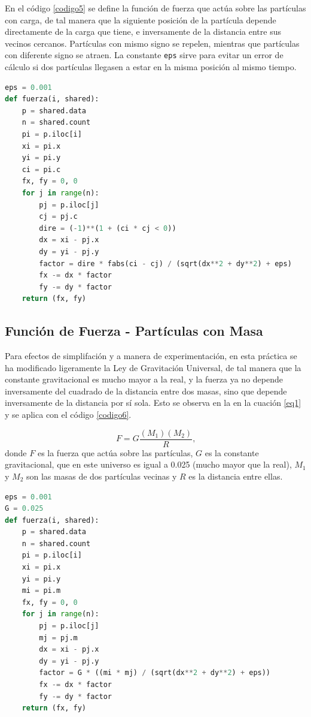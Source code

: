 \documentclass{report}
\begin{document}
En el c\'odigo \ref{codigo5} se define la funci\'on de fuerza que act\'ua sobre las part\'iculas con carga, de tal manera que la siguiente posici\'on de la part\'icula depende directamente de la carga que tiene, e inversamente de la distancia entre sus vecinos cercanos. Part\'iculas con mismo signo se repelen, mientras que part\'iculas con diferente signo se atraen. La constante \texttt{eps} sirve para evitar un error de c\'alculo si dos part\'iculas llegasen a estar en la misma posici\'on al mismo tiempo.

\begin{lstlisting}[caption= Fuerza Aplicada a Part\'iculas con Carga, label=codigo5, language=Python]
eps = 0.001
def fuerza(i, shared):
    p = shared.data
    n = shared.count
    pi = p.iloc[i]
    xi = pi.x
    yi = pi.y
    ci = pi.c
    fx, fy = 0, 0
    for j in range(n):
        pj = p.iloc[j]
        cj = pj.c
        dire = (-1)**(1 + (ci * cj < 0))
        dx = xi - pj.x
        dy = yi - pj.y
        factor = dire * fabs(ci - cj) / (sqrt(dx**2 + dy**2) + eps)
        fx -= dx * factor
        fy -= dy * factor
    return (fx, fy)
\end{lstlisting}

\subsection{Funci\'on de Fuerza - Part\'iculas con Masa}

Para efectos de simplifaci\'on y a manera de experimentaci\'on, en esta pr\'actica se ha modificado ligeramente la Ley de Gravitaci\'on Universal, de tal manera que la constante gravitacional es mucho mayor a la real, y la fuerza ya no depende inversamente del cuadrado de la distancia entre dos masas, sino que depende inversamente de la distancia por s\'i sola. Esto se observa en la en la cuaci\'on \ref{eq1} y se aplica con el c\'odigo \ref{codigo6}.

\begin{equation}\label{eq1}
    F = G\frac{(M_1)(M_2)}{R}\text{,}
\end{equation}
donde $F$ es la fuerza que act\'ua sobre las part\'iculas, $G$ es la constante gravitacional, que en este universo es igual a 0.025 (mucho mayor que la real), $M_1$ y $M_2$ son las masas de dos part\'iculas vecinas y $R$ es la distancia entre ellas.

\begin{lstlisting}[caption= Fuerza Aplicada a Part\'iculas con Masa, label=codigo6, language=Python]
eps = 0.001
G = 0.025
def fuerza(i, shared):
    p = shared.data
    n = shared.count
    pi = p.iloc[i]
    xi = pi.x
    yi = pi.y
    mi = pi.m
    fx, fy = 0, 0
    for j in range(n):
        pj = p.iloc[j]
        mj = pj.m
        dx = xi - pj.x
        dy = yi - pj.y
        factor = G * ((mi * mj) / (sqrt(dx**2 + dy**2) + eps))
        fx -= dx * factor
        fy -= dy * factor
    return (fx, fy)
\end{lstlisting}
\end{document}
